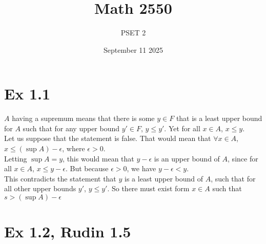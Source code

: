 \documentclass{report}
\title{\Huge{Math 2550}}
\author{\huge{PSET 2}}
\date{September 11 2025}
\begin{document}
\maketitle
\newpage%
\tableofcontents
\pagebreak

\section*{Ex 1.1}

\begin{proofWithHibiscus}
  $A$ having a supremum means that there is some $y \in F$ that is a least upper bound for 
  $A$ such that for any upper bound $y' \in F$, $y \leq y'$. Yet for all $x \in A$, $x \leq y$. \\

  Let us suppose that the statement is false. That would mean that $\forall x \in A$, $x \leq (\sup A) - \epsilon$, where $\epsilon > 0$. \\

  Letting $\sup A = y$, this would mean that $y - \epsilon$ is an upper bound of $A$, since for all $x \in A$, $x \leq y - \epsilon$. But because $\epsilon > 0$, we have $y - \epsilon < y$. \\

  This contradicts the statement that $y$ is a least upper bound of $A$, such that for all other upper bounds $y'$, $y \leq y'$. So there must exist form $x \in A$ such that $s > (\sup A) - \epsilon$ 
\end{proofWithHibiscus}


\section*{Ex 1.2, Rudin 1.5}

\end{document}
